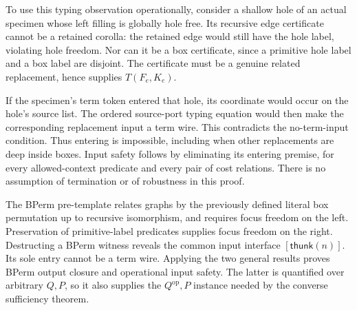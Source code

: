 
To use this typing observation operationally, consider a shallow hole of an
actual specimen whose left filling is globally hole free. Its recursive edge
certificate cannot be a retained corolla: the retained edge would still have
the hole label, violating hole freedom. Nor can it be a box certificate, since
a primitive hole label and a box label are disjoint. The certificate must be
a genuine related replacement, hence supplies $T(F_e,K_e)$.

If the specimen's term token entered that hole, its coordinate would occur
on the hole's source list. The ordered source-port typing equation would then
make the corresponding replacement input a term wire. This contradicts the
no-term-input condition. Thus entering is impossible, including when other
replacements are deep inside boxes. Input safety follows by eliminating its
entering premise, for every allowed-context predicate and every pair of cost
relations. There is no assumption of termination or of robustness in this proof.


The BPerm pre-template relates graphs by the previously defined literal box
permutation up to recursive isomorphism, and requires focus freedom on the left.
Preservation of primitive-label predicates supplies focus freedom on the right.
Destructing a BPerm witness reveals the common input interface
$[\mathsf{thunk}(n)]$. Its sole entry cannot be a term wire. Applying the two
general results proves BPerm output closure and operational input safety.
The latter is quantified over arbitrary $Q,P$, so it also supplies the
$Q^{\mathrm{op}},P$ instance needed by the converse sufficiency theorem.



